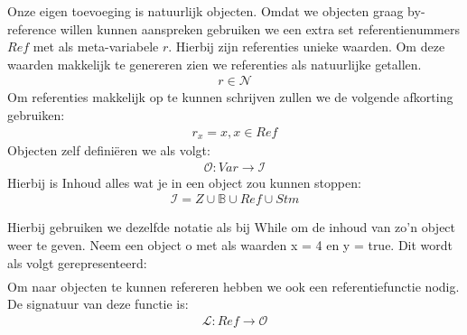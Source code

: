 \documentclass[12pt]{article}
\begin{document}
Onze eigen toevoeging is natuurlijk objecten. Omdat we objecten graag by-reference willen kunnen aanspreken gebruiken we een extra set referentienummers $Ref$ met als meta-variabele $r$. Hierbij zijn referenties unieke waarden. Om deze waarden makkelijk te genereren zien we referenties als natuurlijke getallen. 
\begin{gather*}
r \in \mathcal{N}
\end{gather*}
Om referenties makkelijk op te kunnen schrijven zullen we de volgende afkorting gebruiken:
\begin{gather*}
r_x = x, x \in Ref
\end{gather*}
Objecten zelf definiëren we als volgt:
\begin{gather*}\mathcal{O} : Var \rightarrow \mathcal{I} \end{gather*}
Hierbij is Inhoud alles wat je in een object zou kunnen stoppen: 
\begin{gather*}\mathcal{I} = Z \cup \mathds{B} \cup Ref \cup Stm \end{gather*} 

Hierbij gebruiken we dezelfde notatie als bij While om de inhoud van zo'n object weer te geven.
Neem een object o met als waarden x = 4 en y = true. Dit wordt als volgt gerepresenteerd:
\begin{gather*}[x \mapsto 4, y \mapsto tt]\end{gather*}
Om naar objecten te kunnen refereren hebben we ook een referentiefunctie nodig. De signatuur van deze functie is:
\begin{gather*}\mathcal{L} : Ref \rightarrow \mathcal{O}\end{gather*}	
\end{document}

